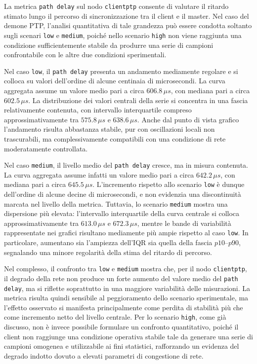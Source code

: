La metrica \texttt{path delay} sul nodo \texttt{clientptp} consente di valutare
il ritardo stimato lungo il percorso di sincronizzazione tra il client e il
master. Nel caso del demone PTP, l’analisi quantitativa di tale grandezza può
essere condotta soltanto sugli scenari \texttt{low} e \texttt{medium}, poiché nello
scenario \texttt{high} non viene raggiunta una condizione sufficientemente
stabile da produrre una serie di campioni confrontabile con le altre due
condizioni sperimentali.

Nel caso \texttt{low}, il \texttt{path delay} presenta un andamento mediamente regolare
e si colloca su valori dell’ordine di alcune centinaia di microsecondi. La curva
aggregata assume un valore medio pari a circa $606.8\,\mu s$, con mediana pari a circa
$602.5\,\mu s$. La distribuzione dei valori centrali della serie si concentra in
una fascia relativamente contenuta, con intervallo interquartile compreso approssimativamente
tra $575.8\,\mu s$ e $638.6\,\mu s$. Anche dal punto di vista grafico
l’andamento risulta abbastanza stabile, pur con oscillazioni locali non trascurabili,
ma complessivamente compatibili con una condizione di rete moderatamente
controllata.

Nel caso \texttt{medium}, il livello medio del \texttt{path delay} cresce, ma in
misura contenuta. La curva aggregata assume infatti un valore medio pari a circa $6
42.2\,\mu s$, con mediana pari a circa $645.5\,\mu s$. L’incremento rispetto allo
scenario \texttt{low} è dunque dell’ordine di alcune decine di microsecondi, e non
evidenzia una discontinuità marcata nel livello della metrica. Tuttavia, lo scenario
\texttt{medium} mostra una dispersione più elevata: l’intervallo interquartile della
curva centrale si colloca approssimativamente tra $613.0\,\mu s$ e $672.3\,\mu s$,
mentre le bande di variabilità rappresentate nei grafici risultano mediamente
più ampie rispetto al caso \texttt{low}. In particolare, aumentano sia l’ampiezza
dell’IQR sia quella della fascia $p10$--$p90$, segnalando una minore regolarità della
stima del ritardo di percorso.

Nel complesso, il confronto tra \texttt{low} e \texttt{medium} mostra che, per il
nodo \texttt{clientptp}, il degrado della rete non produce un forte aumento del valore
medio del \texttt{path delay}, ma si riflette soprattutto in una maggiore variabilità
delle misurazioni. La metrica risulta quindi sensibile al peggioramento dello
scenario sperimentale, ma l’effetto osservato si manifesta principalmente come perdita
di stabilità più che come incremento netto del livello centrale. Per lo scenario
\texttt{high}, come già discusso, non è invece possibile formulare un confronto quantitativo,
poiché il client non raggiunge una condizione operativa stabile tale da generare
una serie di campioni omogenea e utilizzabile ai fini statistici, rafforzando un evidenza
del degrado indotto dovuto a elevati parametri di congestione di rete.

